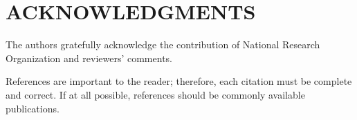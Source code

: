 \documentclass[letterpaper, 10 pt, conference]{ieeeconf}  %
\begin{document}
\section{ACKNOWLEDGMENTS}

The authors gratefully acknowledge the contribution of National Research Organization and reviewers' comments.



References are important to the reader; therefore, each citation must be complete and correct. If at all possible, references should be commonly available publications.








\end{document}
